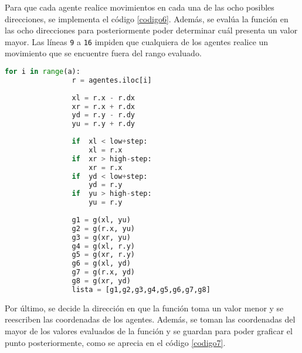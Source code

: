 \documentclass{article}
\begin{document}
Para que cada agente realice movimientos en cada una de las ocho posibles direcciones, se implementa el c\'odigo \ref{codigo6}. Adem\'as, se eval\'ua la funci\'on en las ocho direcciones para posteriormente poder determinar cu\'al presenta un valor mayor. Las l\'ineas \texttt{9} a \texttt{16} impiden que cualquiera de los agentes realice un movimiento que se encuentre fuera del rango evaluado.

\begin{lstlisting}[caption= Movimiento de los Agentes, label=codigo6, language=Python]
            for i in range(a):
                r = agentes.iloc[i]
                
                xl = r.x - r.dx
                xr = r.x + r.dx
                yd = r.y - r.dy
                yu = r.y + r.dy
                
                if  xl < low+step:
                    xl = r.x
                if  xr > high-step:
                    xr = r.x
                if  yd < low+step:
                    yd = r.y
                if  yu > high-step:
                    yu = r.y
                
                g1 = g(xl, yu)
                g2 = g(r.x, yu)
                g3 = g(xr, yu)
                g4 = g(xl, r.y)
                g5 = g(xr, r.y)
                g6 = g(xl, yd)
                g7 = g(r.x, yd)
                g8 = g(xr, yd)
                lista = [g1,g2,g3,g4,g5,g6,g7,g8]
\end{lstlisting}

Por \'ultimo, se decide la direcci\'on en que la funci\'on toma un valor menor y se reescriben las coordenadas de los agentes. Adem\'as, se toman las coordenadas del mayor de los valores evaluados de la funci\'on y se guardan para poder graficar el punto posteriormente, como se aprecia en el c\'odigo \ref{codigo7}.
\end{document}
